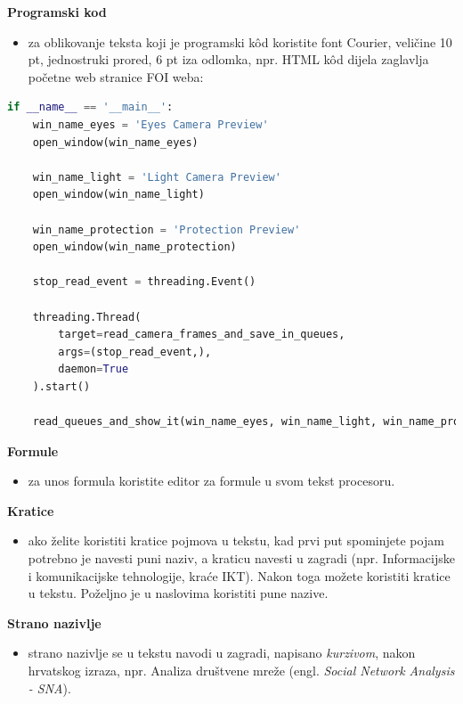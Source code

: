 \documentclass{foi}
\begin{document}
\begin{flushleft}\textbf{Programski kod}\end{flushleft}
\begin{itemize}
    \item za oblikovanje teksta koji je programski kôd koristite font Courier, veličine 10 pt, jednostruki prored, 6 pt iza odlomka, npr. HTML kôd dijela zaglavlja početne web stranice FOI weba:
\end{itemize}

\begin{lstlisting}[language=Python, label={lst:lstlisting}, firstnumber=150, style=colored, caption=Python example]
if __name__ == '__main__':
    win_name_eyes = 'Eyes Camera Preview'
    open_window(win_name_eyes)

    win_name_light = 'Light Camera Preview'
    open_window(win_name_light)

    win_name_protection = 'Protection Preview'
    open_window(win_name_protection)

    stop_read_event = threading.Event()

    threading.Thread(
        target=read_camera_frames_and_save_in_queues,
        args=(stop_read_event,),
        daemon=True
    ).start()

    read_queues_and_show_it(win_name_eyes, win_name_light, win_name_protection)
\end{lstlisting}

\begin{flushleft}\textbf{Formule}\end{flushleft}
\begin{itemize}
    \item za unos formula koristite editor za formule u svom tekst procesoru.
\end{itemize}

\begin{flushleft}\textbf{Kratice}\end{flushleft}   
\begin{itemize}
    \item ako želite koristiti kratice pojmova u tekstu, kad prvi put spominjete pojam potrebno je navesti puni naziv, a kraticu navesti u zagradi (npr. Informacijske i komunikacijske tehnologije, kraće IKT). Nakon toga možete koristiti kratice u tekstu. Poželjno je u naslovima koristiti pune nazive.
\end{itemize}

\begin{flushleft}\textbf{Strano nazivlje}\end{flushleft}   
\begin{itemize}
    \item strano nazivlje se u tekstu navodi u zagradi, napisano \textit{kurzivom}, nakon hrvatskog izraza, npr. Analiza društvene mreže (engl. \textit{Social Network Analysis - SNA}).
\end{itemize}
\end{document}

